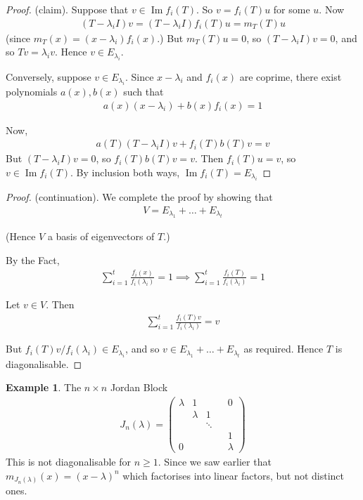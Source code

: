 \documentclass{article}
\theoremstyle{definition} \newtheorem*{definition}{Definition}
\newtheorem*{exmp}{Example} \newtheorem*{exmps}{Examples}
\DeclareMathOperator{\Ima}{Im} \DeclareMathOperator{\Sym}{Sym}
\begin{document}
  \begin{proof}
    (claim). Suppose that $v \in \Ima f_i(T)$. So $v=f_i(T)u$ for some
    $u$. Now
    \begin{align*}
      (T-\lambda_i I)v = (T-\lambda_i I)f_i(T)u = m_T(T)u
    \end{align*}
    (since $m_T(x)=(x-\lambda_i)f_i(x)$.) But $m_T(T)u=0$, so 
    $(T-\lambda_i I)v=0$, and so $Tv = \lambda_i v$. Hence
    $v \in E_{\lambda_i}$.

    Conversely, suppose $v \in E_{\lambda_i}$. Since $x-\lambda_i$ and
    $f_i(x)$ are coprime, there exist polynomials $a(x),b(x)$ such that
    \begin{align*}
      a(x)(x-\lambda_i)+ b(x)f_i(x) = 1
    \end{align*}

    Now,
    \begin{align*}
      a(T)(T-\lambda_i I)v + f_i(T)b(T)v = v
    \end{align*}
    But $(T-\lambda_i I)v=0$, so $f_i(T)b(T)v = v$. Then
    $f_i(T)u = v$, so $v \in \Ima f_i(T)$. By inclusion both ways,
    $\Ima f_i(T)=E_{\lambda_i}$
  \end{proof}
  \begin{proof}
    (continuation).
We complete the proof by showing that
\begin{align*}
  V = E_{\lambda_1}+\dots+E_{\lambda_t}
\end{align*}

(Hence $V$ a basis of eigenvectors of $T$.)

By the Fact,
\begin{align*}
  \sum_{i=1}^{t}\frac{f_i(x)}{f_i(\lambda_i)}=1\implies
  \sum_{i=1}^{t}\frac{f_i(T)}{f_i(\lambda_i)}=1
\end{align*}

Let $v \in V$. Then
\begin{align*}
  \sum_{i=1}^{t}\frac{f_i(T)v}{f_i(\lambda_i)}=v
\end{align*}

But $f_i(T)v/f_i(\lambda_i)\in E_{\lambda_i}$, and so $v \in 
E_{\lambda_1}+\dots+E_{\lambda_t}$ as required. Hence $T$ is 
diagonalisable.
  \end{proof}


\begin{exmp}
  The $n \times n$ Jordan Block 
  \begin{align*}
    J_n(\lambda)=\left( 
    \begin{matrix}
      \lambda & 1       &        & & 0   \\
              & \lambda &      1 & &     \\
              &         & \ddots & &     \\
              &         &        & & 1   \\
       0      &         &        & & \lambda
    \end{matrix}
    \right)
  \end{align*}
  This is not diagonalisable for $n\ge 1$. Since we saw earlier that
  $m_{J_n(\lambda)}(x)=(x-\lambda)^n$ which factorises into linear
  factors, but not distinct ones.
\end{exmp}
\end{document}
